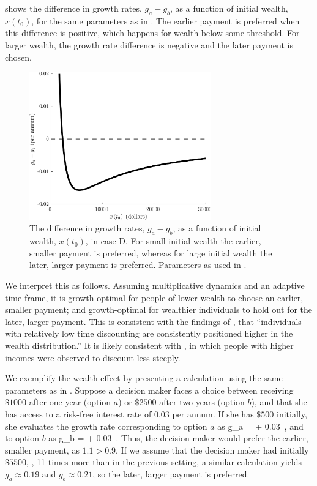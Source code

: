  shows the difference in growth rates, $g_a-g_b$, as a function of initial wealth, $x\left(t_0\right)$, for the same parameters as in . The earlier payment is preferred when this difference is positive, which happens for wealth below some threshold. For larger wealth, the growth rate difference is negative and the later payment is chosen.

\begin{figure}[!htb]
\centering
\includegraphics[width=0.7\textwidth]{./figures/caseD_ga_gb.jpg}
\caption{The difference in growth rates, $g_a-g_b$, as a function of initial wealth, $x\left(t_0\right)$, in case D. For small initial wealth the earlier, smaller payment is preferred, whereas for large initial wealth the later, larger payment is preferred. Parameters as used in .}
\end{figure}

We interpret this as follows. Assuming multiplicative dynamics and an adaptive time frame, it is growth-optimal for people of lower wealth to choose an earlier, smaller payment; and growth-optimal for wealthier individuals to hold out for the later, larger payment. This is consistent with the findings of \citet{EpperETAL2018}, that ``individuals with relatively low time discounting are consistently positioned higher in the wealth distribution.'' It is likely consistent with \citep{GreenETAL1996}, in which people with higher incomes were observed to discount less steeply. 

We exemplify the wealth effect by presenting a calculation using the same parameters as in . Suppose a decision maker faces a choice between receiving $\$1000$ after one year (option $a$) or $\$2500$ after two years (option $b$), and that she has access to a risk-free interest rate of 0.03 per annum. If she has $\$500$ initially, she evaluates the growth rate corresponding to option $a$ as
%
\be
g_a =  + 0.03 \,,
\ee
%
and to option $b$ as
%
\be
g_b =  + 0.03 \,.
\ee
%
Thus, the decision maker would prefer the earlier, smaller payment, as $1.1 > 0.9$. If we assume that the decision maker had initially $\$5500$, \ie, 11 times more than in the previous setting, a similar calculation yields $g_a\approx0.19$ and $g_b\approx0.21$, so the later, larger payment is preferred.

